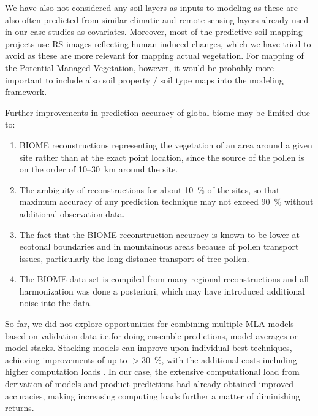\documentclass[fleqn,10pt,lineno]{wlpeerj} %
\begin{document}
We have also not considered any soil layers as inputs to modeling as these are also often predicted from similar climatic and remote sensing layers already used in our case studies as covariates. Moreover, most of the predictive soil mapping projects use RS images reflecting human induced changes, which we have tried to avoid as these are more relevant for mapping actual vegetation. For mapping of the Potential Managed Vegetation, however, it would be probably more important to include also soil property / soil type maps into the modeling framework.\par

Further improvements in prediction accuracy of global biome may be limited due to:

\begin{enumerate}
\item BIOME reconstructions representing the vegetation of an area around a given site rather than at the exact point location, since the source of the pollen is on the order of \@ 10--\SI{30}{\kilo\metre} around the site.
\item The ambiguity of reconstructions for about \SI{10}{\percent} of the sites, so that maximum accuracy of any prediction technique may not exceed \SI{90}{\percent} without additional observation data.
\item The fact that the BIOME reconstruction accuracy is known to be lower at ecotonal boundaries and in mountainous areas because of pollen transport issues, particularly the long-distance transport of tree pollen.
\item The BIOME data set is compiled from many regional reconstructions and all harmonization was done a posteriori, which may have introduced additional noise into the data.
\end{enumerate}
\par

So far, we did not explore opportunities for combining multiple MLA models based on validation data i.e.\@ for doing ensemble predictions, model averages or model stacks. Stacking models can improve upon individual best techniques, achieving improvements of up to $>$\SI{30}{\percent}, with the additional costs including higher computation loads \citep{michailidis2017investigating}. In our case, the extensive computational load from derivation of models and product predictions had already obtained improved accuracies, making increasing computing loads further a matter of diminishing returns.\par
\end{document}
